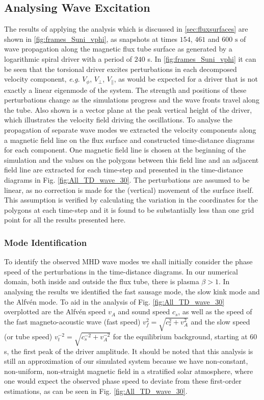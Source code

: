 \subsection{Analysing Wave Excitation}\label{sec:driveranalysis}
The results of applying the analysis which is discussed in \cref{sec:fluxsurfaces} are shown in \cref{fig:frames_Suni_vphi}, as snapshots at times $154$, $461$ and $600 \text{ s}$ of wave propagation along the magnetic flux tube surface as generated by a logarithmic spiral driver with a period of $240$ s.
In \cref{fig:frames_Suni_vphi} it can be seen that the torsional driver excites perturbations in each decomposed velocity component, \textit{e.g.} $V_\phi$,  $V_\perp$, $V_\parallel$, as would be expected for a driver that is not exactly a linear eigenmode of the system. 
The strength and positions of these perturbations change as the simulations progress and the wave fronts travel along the tube. 
Also shown is a vector plane at the peak vertical height of the driver, which illustrates the velocity field driving the oscillations.
To analyse the propagation of separate wave modes we extracted the velocity components along a magnetic field line on the flux surface and constructed time-distance diagrams for each component. 
One magnetic field line is chosen at the beginning of the simulation and the values on the polygons between this field line and an adjacent field line are extracted for each time-step and presented in the time-distance diagrams in Fig. \ref{fig:All_TD_wave_30}. 
The perturbations are assumed to be linear, as no correction is made for the (vertical) movement of the surface itself. 
This assumption is verified by calculating the variation in the coordinates for the polygons at each time-step and it is found to be substantially less than one grid point for all the results presented here.

\subsubsection{Mode Identification}
To identify the observed MHD wave modes we shall initially consider the phase speed of the perturbations in the time-distance diagrams. 
In our numerical domain, both inside and outside the flux tube, there is plasma $\beta > 1$.
In analysing the results we identified the fast sausage mode, the slow kink mode and the Alfv\'en mode.
To aid in the analysis of Fig. \ref{fig:All_TD_wave_30} overplotted are the Alfv\'en speed $v_A$ and sound speed $c_s$, as well as the speed of the fast magneto-acoustic wave (fast speed) $v_f^2 = \sqrt{c_s^2 + v_A^2}$ and the slow speed (or tube speed) $v_t^{-2} = \sqrt{c_s^{-2} + v_A^{-2}}$ for the equilibrium background, starting at $60$ s, the first peak of the driver amplitude. 
It should be noted that this analysis is still an approximation of our simulated system because we have non-constant, non-uniform, non-straight magnetic field in a stratified solar atmosphere, where one would expect the observed phase speed to deviate from these first-order estimations, as can be seen in Fig. \ref{fig:All_TD_wave_30}.

